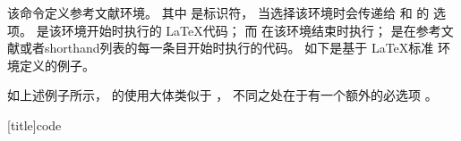 \begin{ltxsyntax}



该命令定义参考文献环境。
其中  是标识符，
当选择该环境时会传递给  和  的  选项。
 是该环境开始时执行的 \LaTeX 代码；
而  在该环境结束时执行；
 是在参考文献或者shorthand列表的每一条目开始时执行的代码。
如下是基于 \LaTeX 标准  环境定义的例子。

\begin{ltxexample}
  {\list{}
     {\setlength{\leftmargin}{\bibhang}%
      \setlength{\itemindent}{-\leftmargin}%
      \setlength{\itemsep}{\bibitemsep}%
      \setlength{\parsep}{\bibparsep}}}
  {\endlist}
  {\item}
\end{ltxexample}
%
如上述例子所示， 的使用大体类似于 ，
不同之处在于有一个额外的必选项 。

[title]{code}



\end{ltxsyntax}
